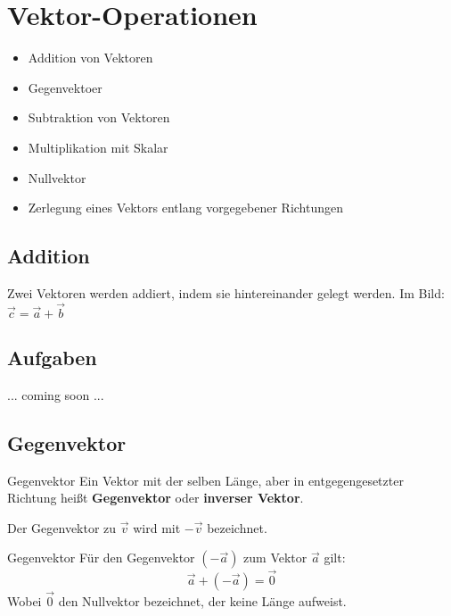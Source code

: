 \section{Vektor-Operationen}

\begin{itemize}
\item Addition von Vektoren
\item Gegenvektoer
\item Subtraktion von Vektoren
\item Multiplikation mit Skalar
\item Nullvektor
\item Zerlegung eines Vektors entlang vorgegebener Richtungen
\end{itemize}

\newpage

\subsection{Addition}

Zwei Vektoren werden addiert, indem sie hintereinander gelegt
werden. Im Bild: $\vec{c} = \vec{a} + \vec{b}$


\subsection*{Aufgaben}
... coming soon ...

\newpage


\subsection{Gegenvektor}

\begin{definition}{Gegenvektor}{}
  Ein Vektor mit der selben Länge, aber in entgegengesetzter Richtung
  heißt \textbf{Gegenvektor} oder \textbf{inverser Vektor}.

  Der Gegenvektor zu $\vec{v}$ wird mit $-\vec{v}$ bezeichnet.
\end{definition}

\begin{bemerkung}{Gegenvektor}{}
  Für den Gegenvektor $(-\vec{a})$ zum Vektor $\vec{a}$ gilt:
  $$\vec{a} + (-\vec{a}) = \vec{0}$$
Wobei $\vec{0}$ den Nullvektor bezeichnet, der keine Länge aufweist.
  
\end{bemerkung}

